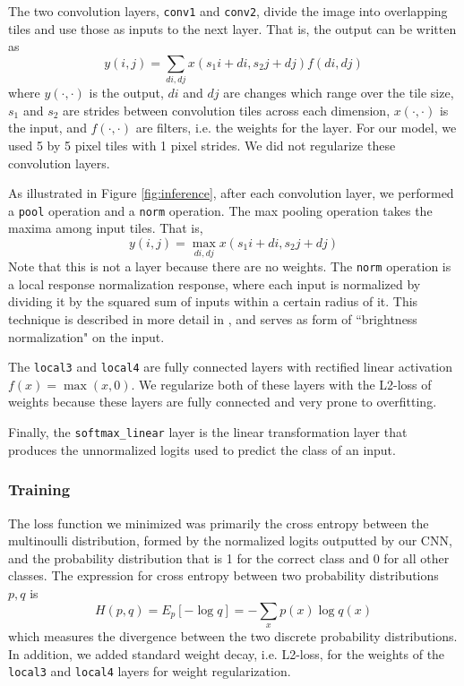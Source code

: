 \documentclass[10pt, twocolumn, twoside]{article}
\begin{document}
The two convolution layers, \texttt{conv1} and \texttt{conv2}, divide the image into overlapping
tiles and use those as inputs to the next layer. That is, the output can be written as
\[ y(i, j) = \sum_{di, dj} x(s_1i + di, s_2j + dj) f(di, dj)\]
where $y(\cdot, \cdot)$ is the output, $di$ and $dj$ are changes which range over the tile size,
$s_1$ and $s_2$ are strides between convolution tiles across each dimension,
$x(\cdot, \cdot)$ is the input, and $f(\cdot, \cdot)$ are filters, i.e. the weights for the layer.
For our model, we used 5 by 5 pixel tiles with 1 pixel strides. We did not regularize these
convolution layers.

As illustrated in Figure \ref{fig:inference}, after each convolution layer, we performed a
\texttt{pool} operation and a \texttt{norm} operation. The max pooling operation takes the
maxima among input tiles. That is,
\[ y(i, j) = \max_{di, dj} x(s_1i + di, s_2j + dj)\]
Note that this is not a layer because there are no weights. The \texttt{norm} operation is a
local response normalization response, where each input is normalized by dividing it by the squared
sum of inputs within a certain radius of it. This technique is described in more detail in
\cite{Krizhevsky}, and serves as form of ``brightness normalization" on the input.

The \texttt{local3} and \texttt{local4} are fully connected layers with rectified linear activation
$f(x) = \max(x, 0)$. We regularize both of these layers with the L2-loss of weights because
these layers are fully connected and very prone to overfitting.

Finally, the \texttt{softmax\_linear} layer is the linear transformation layer that produces the
unnormalized logits used to predict the class of an input.

\subsubsection{Training}

The loss function we minimized was primarily the cross entropy between the multinoulli distribution, formed by the normalized logits outputted by our CNN, and the probability distribution that is 1 for the correct class and 0 for all other classes. The expression for cross entropy between two probability distributions $p, q$ is
\[H(p, q) = E_p[-\log q] = -\sum_x p(x)\log q(x)\]
which measures the divergence between the two discrete probability distributions. In addition, we added standard weight decay, i.e. L2-loss, for the weights of the \texttt{local3} and \texttt{local4} layers for weight regularization.
\end{document}
